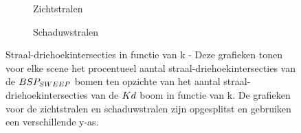 \begin{figure}
  \centering
  \begin{subfigure}{\linewidth}
  \centering
  \begin{subfigure}[t]{.32\linewidth}
    \centering
{}
  \end{subfigure}
  \begin{subfigure}[t]{.32\linewidth}
    \centering
{}
\end{subfigure}
\begin{subfigure}[t]{.32\linewidth}
  \centering
{}
\end{subfigure}
\caption{Zichtstralen}
\end{subfigure}
\begin{subfigure}{\linewidth}
  \centering
  \begin{subfigure}[t]{.32\linewidth}
    \centering
{}
  \end{subfigure}
  \begin{subfigure}[t]{.32\linewidth}
    \centering
{}
\end{subfigure}
\begin{subfigure}[t]{.32\linewidth}
  \centering
{}
\end{subfigure}
\caption{Schaduwstralen}
\end{subfigure}
\caption[Straal-driehoekintersecties in functie van k]{Straal-driehoekintersecties in functie van k - \small Deze grafieken tonen voor elke scene het procentueel aantal straal-driehoekintersecties van de $BSP_{SWEEP}$ bomen ten opzichte van het aantal straal-driehoekintersecties van de $Kd$ boom in functie van k. De grafieken voor de zichtstralen en schaduwstralen zijn opgesplitst en gebruiken een verschillende y-as.}
\label{fig:k-intersecties}
\end{figure}

